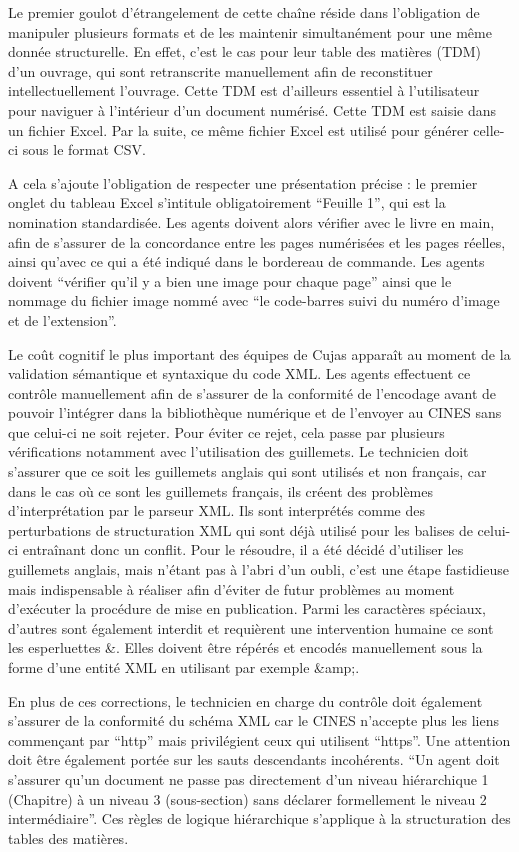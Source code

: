 Le premier goulot d'étrangelement de cette chaîne réside dans l'obligation de manipuler plusieurs formats et de les maintenir simultanément pour une même donnée structurelle. En effet, c'est le cas pour leur table des matières (TDM) d'un ouvrage, qui sont retranscrite manuellement afin de reconstituer intellectuellement l'ouvrage. Cette TDM est d'ailleurs essentiel à l'utilisateur pour naviguer à l'intérieur d'un document numérisé. Cette TDM est saisie dans un fichier Excel. Par la suite, ce même fichier Excel est utilisé pour générer celle-ci sous le format CSV.

A cela s'ajoute l'obligation de respecter une présentation précise : le premier onglet du tableau Excel s'intitule obligatoirement \enquote{Feuille 1}, qui est la nomination standardisée. Les agents doivent alors vérifier avec le livre en main, afin de s'assurer de la concordance entre les pages numérisées et les pages réelles, ainsi qu'avec ce qui a été indiqué dans le bordereau de commande. Les agents doivent \enquote{vérifier qu'il y a bien une image pour chaque page} ainsi que le nommage du fichier image nommé avec \enquote{le code-barres suivi du numéro d'image et de l'extension}. 

Le coût cognitif le plus important des équipes de Cujas apparaît au moment de la validation sémantique et syntaxique du code XML. Les agents effectuent ce contrôle manuellement afin de s'assurer de la conformité de l'encodage avant de pouvoir l'intégrer dans la bibliothèque numérique et de l'envoyer au CINES sans que celui-ci ne soit rejeter. Pour éviter ce rejet, cela passe par plusieurs vérifications notamment avec l'utilisation des guillemets. Le technicien doit s'assurer que ce soit les guillemets anglais qui sont utilisés et non français, car dans le cas où ce sont les guillemets français, ils créent des problèmes d'interprétation par le parseur XML. Ils sont interprétés comme des perturbations de structuration XML qui sont déjà utilisé pour les balises de celui-ci entraînant donc un conflit. Pour le résoudre, il a été décidé d'utiliser les guillemets anglais, mais n'étant pas à l'abri d'un oubli, c'est une étape fastidieuse mais indispensable à réaliser afin d'éviter de futur problèmes au moment d'exécuter la procédure de mise en publication. Parmi les caractères spéciaux, d'autres sont également interdit et requièrent une intervention humaine ce sont les esperluettes \&. Elles doivent être répérés et encodés manuellement sous la forme d'une entité XML en utilisant par exemple \&amp;.

En plus de ces corrections, le technicien en charge du contrôle doit également s'assurer de la conformité du schéma XML car le CINES n'accepte plus les liens commençant par \enquote{http} mais privilégient ceux qui utilisent \enquote{https}. Une attention doit être également portée sur les sauts descendants incohérents. \enquote{Un agent doit s'assurer qu'un document ne passe pas directement d'un niveau hiérarchique 1 (Chapitre) à un niveau 3 (sous-section) sans déclarer formellement le niveau 2 intermédiaire}. Ces règles de logique hiérarchique s'applique à la structuration des tables des matières. 

